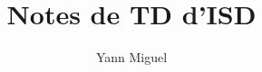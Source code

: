\documentclass[12pt, a4paper]{article}
\title{Notes de TD d'ISD}
\author{Yann Miguel}
\begin{document}
\ttfamily
\maketitle
\tableofcontents
\newpage

%
%
%
\end{document}

